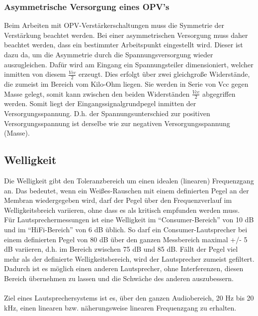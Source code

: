 \subsubsection*{Asymmetrische Versorgung eines OPV's}\label{subsec:8.5.1}
Beim Arbeiten mit OPV-Verstärkerschaltungen muss die Symmetrie der Verstärkung beachtet werden.
Bei einer asymmetrischen Versorgung muss daher beachtet werden, dass ein bestimmter Arbeitspunkt eingestellt wird.
Dieser ist dazu da, um die Asymmetrie durch die Spannungsversorgung wieder auszugleichen.
Dafür wird am Eingang ein Spannungsteiler dimensioniert, welcher inmitten von diesem $\frac{Vcc}{2}$ erzeugt.
Dies erfolgt über zwei gleichgroße Widerstände, die zumeist im Bereich vom Kilo-Ohm liegen.
Sie werden in Serie von Vcc gegen Masse gelegt, somit kann zwischen den beiden Widerständen $\frac{Vcc}{2}$ abgegriffen werden.
Somit liegt der Eingangssignalgrundpegel inmitten der Versorgungsspannung.
D.h. der Spannungsunterschied zur positiven Versorgungsspannung ist derselbe wie zur negativen Versorgungsspannung (Masse). 


\newpage
\subsection{Welligkeit} \label{sec:8.6}
Die Welligkeit gibt den Toleranzbereich um einen idealen (linearen) Frequenzgang an.
Das bedeutet, wenn ein Weißes-Rauschen mit einem definierten Pegel an der Membran wiedergegeben wird, darf der Pegel über den Frequenzverlauf im Welligkeitsbreich variieren, ohne dass es als kritisch empfunden werden muss. \\
Für Lautsprechermessungen ist eine Welligkeit im \enquote{Consumer-Bereich} von 10 dB und im \enquote{HiFi-Bereich} von 6 dB üblich.
So darf ein Consumer-Lautsprecher bei einem definierten Pegel von 80 dB über den ganzen Messbereich maximal +/- 5 dB variieren, d.h. im Bereich zwischen 75 dB und 85 dB.
Fällt der Pegel viel mehr als der definierte Welligkeitsbereich, wird der Lautsprecher zumeist gefiltert.
Dadurch ist es möglich einen anderen Lautsprecher, ohne Interferenzen, diesen Bereich übernehmen zu lassen und die Schwäche des anderen auszubessern.\\ \\
Ziel eines Lautsprechersystems ist es, über den ganzen Audiobereich, 20 Hz bis 20 kHz, einen linearen bzw. näherungsweise linearen Frequenzgang zu erhalten.

